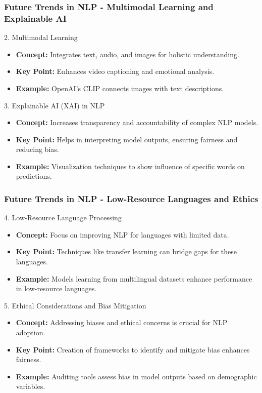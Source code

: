 \documentclass{beamer}
\begin{document}
\begin{frame}[fragile]
    \frametitle{Future Trends in NLP - Multimodal Learning and Explainable AI}
    \begin{block}{2. Multimodal Learning}
        \begin{itemize}
            \item \textbf{Concept:} Integrates text, audio, and images for holistic understanding.
            \item \textbf{Key Point:} Enhances video captioning and emotional analysis.
            \item \textbf{Example:} OpenAI’s CLIP connects images with text descriptions.
        \end{itemize}
    \end{block}

    \begin{block}{3. Explainable AI (XAI) in NLP}
        \begin{itemize}
            \item \textbf{Concept:} Increases transparency and accountability of complex NLP models.
            \item \textbf{Key Point:} Helps in interpreting model outputs, ensuring fairness and reducing bias.
            \item \textbf{Example:} Visualization techniques to show influence of specific words on predictions.
        \end{itemize}
    \end{block}
\end{frame}

\begin{frame}[fragile]
    \frametitle{Future Trends in NLP - Low-Resource Languages and Ethics}
    \begin{block}{4. Low-Resource Language Processing}
        \begin{itemize}
            \item \textbf{Concept:} Focus on improving NLP for languages with limited data.
            \item \textbf{Key Point:} Techniques like transfer learning can bridge gaps for these languages.
            \item \textbf{Example:} Models learning from multilingual datasets enhance performance in low-resource languages.
        \end{itemize}
    \end{block}

    \begin{block}{5. Ethical Considerations and Bias Mitigation}
        \begin{itemize}
            \item \textbf{Concept:} Addressing biases and ethical concerns is crucial for NLP adoption.
            \item \textbf{Key Point:} Creation of frameworks to identify and mitigate bias enhances fairness.
            \item \textbf{Example:} Auditing tools assess bias in model outputs based on demographic variables.
        \end{itemize}
    \end{block}
\end{frame}
\end{document}
